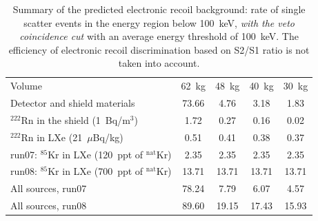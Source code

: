 \begin{table}[!h]
\centering
\caption[Summary of the predicted electronic recoil background with veto coincidence cut]{Summary of the predicted electronic recoil background: rate of single scatter events in the energy region below 100~keV, {\it with the veto coincidence cut} with an average energy threshold of 100~keV. The efficiency of electronic recoil discrimination based on S2/S1 ratio is not taken into account.}
\label{tabSummaryElectronRecoilsActiveVeto}
\begin{tabular}{>{\footnotesize}l |>{\footnotesize} c |>{\footnotesize} c |>{\footnotesize} c |>{\footnotesize} c }
\hline
&  \multicolumn{4}{>{\footnotesize}c}{[$\times$10$^{-3}$ events$\cdot$kg$^{-1}\cdot$day$^{-1}\cdot$keV$^{-1}$]}\\
\hline
Volume &  62~kg & 48~kg & 40~kg & 30~kg \\
\hline
Detector and shield materials			& 73.66	& 4.76	& 3.18  	& 1.83 \\
$^{222}$Rn in the shield (1~Bq/m$^{3}$)	& 1.72	& 0.27	& 0.16  	& 0.02 \\
$^{222}$Rn in LXe (21~$\mu$Bq/kg)	& 0.51	& 0.41	& 0.38       	& 0.37\\
run07: $^{85}$Kr in LXe (120~ppt of $^{\mathrm{nat}}$Kr) 	& 2.35 	& 2.35	& 2.35 	& 2.35 \\
run08: $^{85}$Kr in LXe (700~ppt of $^{\mathrm{nat}}$Kr) 	& 13.71 	& 13.71	& 13.71 	& 13.71 \\
\hline
All sources, run07  					& 78.24 	& 7.79	& 6.07       & 4.57 \\
All sources, run08  					& 89.60	& 19.15	&  17.43    & 15.93 \\
\hline
\end{tabular}
\end{table}

